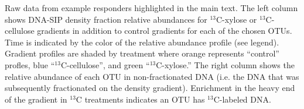 Raw data from example responders highlighted in the main text. The left column
shows DNA-SIP density fraction relative abundances for $^{13}$C-xylose or
$^{13}$C-cellulose gradients in addition to control gradients for each of the
chosen OTUs. Time is indicated by the color of the relative abundance profile
(see legend). Gradient profiles are shaded by treatment where orange represents
``control'' profles, blue ``$^{13}$C-cellulose'', and green
``$^{13}$C-xylose.'' The right column shows the relative abundance of each OTU
in non-fractionated DNA (i.e. the DNA that was subsequently fractionated on the
density gradient). Enrichment in the heavy end of the gradient in $^{13}$C
treatments indicates an OTU has $^{13}$C-labeled DNA.

